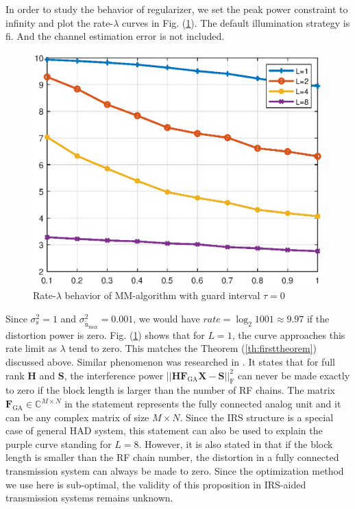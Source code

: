 \documentclass[12pt,draftclsnofoot,onecolumn,journal]{IEEEtran}
\begin{document}
In order to study the behavior of regularizer, we set the peak power constraint to infinity and plot the rate-$\lambda$ curves in Fig. (\ref{fig:ratelambda}). The default illumination strategy is \ac{fi}. And the channel estimation error is not included. 

\begin{figure}[htbp]\flushleft
\includegraphics[width=6in]{lmd.eps} 
\caption{Rate-$\lambda$ behavior of MM-algorithm with guard interval $\tau=0$} \label{fig:ratelambda}
\end{figure}

Since $\sigma_{\mathrm{s}}^2=1$ and $\sigma_{\tilde{\mathrm n}_{\mathrm{max}}}^2=0.001$,
 we would have $rate=\log_2 1001\approx9.97$ if the distortion power is zero. Fig. (\ref{fig:ratelambda}) shows that for $L=1$, the curve approaches this rate limit as $\lambda$ tend to zero. This matches the Theorem (\ref{th:firsttheorem}) discussed above.  Similar phenomenon was researched in \cite{sedaghat2017novel}. It states that for full rank $\mathbf H$ and $\mathbf S$, the interference power $\left|\left|\mathbf{H}\mathbf{F}_\mathrm{GA}\mathbf X-\mathbf S\right|\right|_\mathrm{F}^2$ can never be made exactly to zero if the block length is larger than the number of RF chains. The matrix $\mathbf F_{\mathrm{GA}}\in \mathbb C^{M\times N}$ in the statement represents the fully connected analog unit and it can be any complex matrix of size $M\times N$. Since the IRS structure is a special case of general HAD system, this statement can also be used to explain the purple curve standing for $L=8$. However, it is also stated in \cite{sedaghat2017novel} that if the block length is smaller than the RF chain number,  the distortion in a fully connected transmission system can always be made to zero. Since the optimization method we use here is sub-optimal, the validity of this proposition in IRS-aided transmission systems remains unknown.
\end{document}
